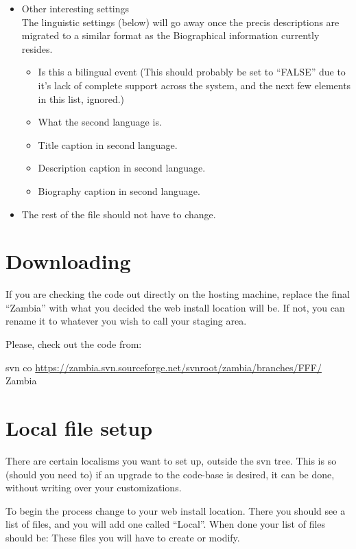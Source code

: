 \documentclass[tablesignature]{scrartcl}
\begin{document}
\begin{itemize}
\item Other interesting settings\\
\label{sec-1_2_4_5}%
The linguistic settings (below) will go away once the precis
     descriptions are migrated to a similar format as the Biographical
     information currently resides.
\begin{itemize}
\item Is this a bilingual event (This should probably be set to
       ``FALSE'' due to it's lack of complete support across the system,
       and the next few elements in this list, ignored.)
\item What the second language is.
\item Title caption in second language.
\item Description caption in second language.
\item Biography caption in second language.
\end{itemize}


\item The rest of the file should not have to change.\\
\label{sec-1_2_4_6}%
\end{itemize} %
\section{Downloading}
\label{sec-2}

  If you are checking the code out directly on the hosting machine,
  replace the final ``Zambia'' with what you decided the web install
  location will be.  If not, you can rename it to whatever you wish to
  call your staging area.

  Please, check out the code from:

  svn co \href{https://zambia.svn.sourceforge.net/svnroot/zambia/branches/FFF/}{https://zambia.svn.sourceforge.net/svnroot/zambia/branches/FFF/} Zambia
\section{Local file setup}
\label{sec-3}

  There are certain localisms you want to set up, outside the svn
  tree. This is so (should you need to) if an upgrade to the code-base
  is desired, it can be done, without writing over your
  customizations.

  To begin the process change to your web install location.  There you
  should see a list of files, and you will add one called ``Local''.
  When done your list of files should be:
  These files you will have to create or modify.
\end{document}
